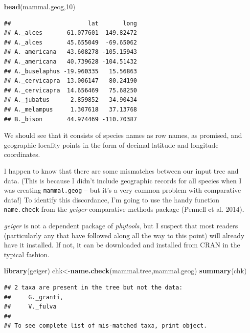 \documentclass[fleqn,10pt,lineno]{wlpeerj} %
\newenvironment{Shaded}{\begin{snugshade}}{\end{snugshade}}
\newcommand{\DecValTok}[1]{\textcolor[rgb]{0.00,0.00,0.81}{#1}}
\newcommand{\FunctionTok}[1]{\textcolor[rgb]{0.13,0.29,0.53}{\textbf{#1}}}
\newcommand{\NormalTok}[1]{#1}
\newcommand{\OtherTok}[1]{\textcolor[rgb]{0.56,0.35,0.01}{#1}}
\begin{document}
\begin{Shaded}
\begin{Highlighting}[]
\FunctionTok{head}\NormalTok{(mammal.geog,}\DecValTok{10}\NormalTok{)}
\end{Highlighting}
\end{Shaded}

\begin{verbatim}
##                      lat       long
## A._alces       61.077601 -149.82472
## A._alces       45.655049  -69.65062
## A._americana   43.608278 -105.15943
## A._americana   40.739628 -104.51432
## A._buselaphus -19.960335   15.56863
## A._cervicapra  13.006147   80.24190
## A._cervicapra  14.656469   75.68250
## A._jubatus     -2.859852   34.90434
## A._melampus     1.307618   37.13768
## B._bison       44.974469 -110.70387
\end{verbatim}

We should see that it consists of species names as row names, as promised, and geographic locality points in the form of decimal latitude and longitude coordinates.

I happen to know that there are some mismatches between our input tree and data. (This is because I didn't include geographic records for all species when I was creating \texttt{mammal.geog} -- but it's a very common problem with comparative data!) To identify this discordance, I'm going to use the handy function \texttt{name.check} from the \emph{geiger} comparative methods package (Pennell et al. 2014).

\emph{geiger} is not a dependent package of \emph{phytools}, but I suspect that most readers (particularly any that have followed along all the way to this point) will already have it installed. If not, it can be downloaded and installed from CRAN in the typical fashion.

\begin{Shaded}
\begin{Highlighting}[]
\FunctionTok{library}\NormalTok{(geiger)}
\NormalTok{chk}\OtherTok{\textless{}{-}}\FunctionTok{name.check}\NormalTok{(mammal.tree,mammal.geog)}
\FunctionTok{summary}\NormalTok{(chk)}
\end{Highlighting}
\end{Shaded}

\begin{verbatim}
## 2 taxa are present in the tree but not the data:
##     G._granti,
##     V._fulva
## 
## To see complete list of mis-matched taxa, print object.
\end{verbatim}
\end{document}
